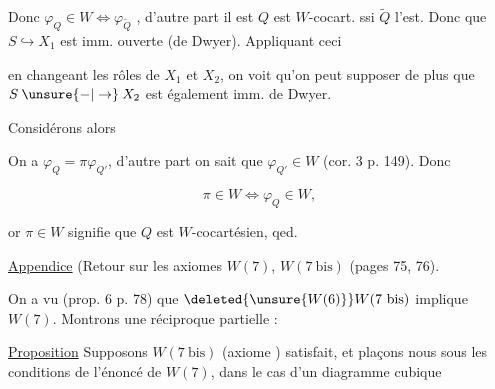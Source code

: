 Donc $\varphi_Q\in W\Longleftrightarrow\varphi_{\widetilde Q}$ , d'autre part il est  $Q$ est $W$-cocart. ssi $\widetilde Q$ l'est. Donc  que $S\hookrightarrow X_1$ est imm. ouverte (de Dwyer). Appliquant ceci

en changeant les rôles de $X_1$ et $X_2$, on voit qu'on peut supposer de plus que $S\mathbin{\unsure{-|\to}}X_2$ est également imm.  de Dwyer.

Considérons alors


On a $\varphi_Q=\pi\varphi_{Q'}$, d'autre part on sait que $\varphi_{Q'}\in W$ (cor. 3 p. 149). Donc

\[
\pi\in W\Longleftrightarrow\varphi_Q\in W,
\]

or $\pi\in W$ signifie que $Q$ est $W$-cocartésien, qed.


 \uline{Appendice} (Retour sur les axiomes $W(7)$, $W(7\ \mathrm{bis})$ (pages 75, 76).

On a vu (prop. 6 p. 78) que $\deleted{\unsure{W(6)}}W(7\ \mathrm{bis})$ implique $W(7)$. Montrons une réciproque partielle :

\uline{Proposition} Supposons $W(7\ \mathrm{bis})$ (axiome   ) satisfait, et plaçons nous sous les conditions de l'énoncé de $W(7)$,  dans le cas d'un diagramme cubique


